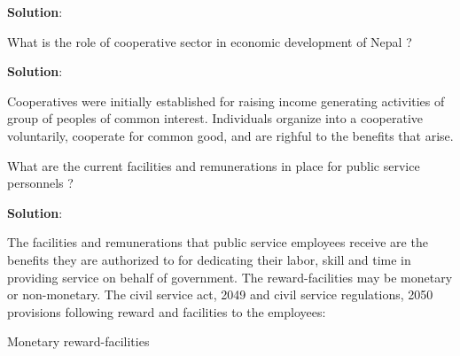\documentclass[
  openany]{book}
\newcommand{\question}{\item}
\newenvironment{solution}{ {\bfseries Solution}:}{}
\begin{document}
\begin{questions}
\begin{solution}
\end{solution}

\question What is the role of cooperative sector in economic development of Nepal ?

\begin{solution}

Cooperatives were initially established for raising income generating activities of group of peoples of common interest. Individuals organize into a cooperative voluntarily, cooperate for common good, and are righful to the benefits that arise.

\end{solution}

\question What are the current facilities and remunerations in place for public service personnels ?

\begin{solution}

The facilities and remunerations that public service employees receive are the benefits they are authorized to for dedicating their labor, skill and time in providing service on behalf of government. The reward-facilities may be monetary or non-monetary. The civil service act, 2049 and civil service regulations, 2050 provisions following reward and facilities to the employees:

Monetary reward-facilities


\end{solution}
\end{questions}
\end{document}
